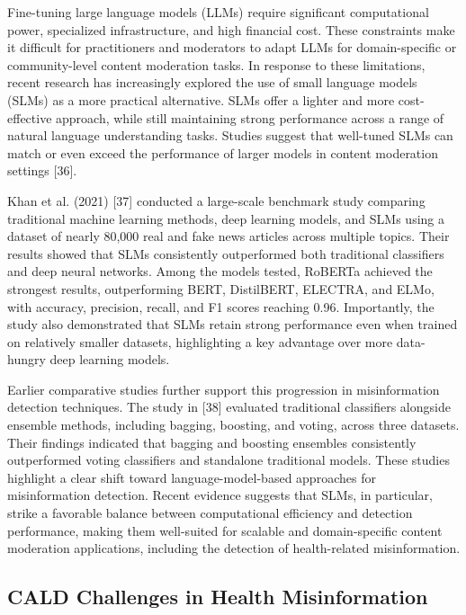 \documentclass[]{article}
\begin{document}
Fine-tuning large language models (LLMs) require significant
computational power, specialized infrastructure, and high financial
cost. These constraints make it difficult for practitioners and
moderators to adapt LLMs for domain-specific or community-level content
moderation tasks. In response to these limitations, recent research has
increasingly explored the use of small language models (SLMs) as a more
practical alternative. SLMs offer a lighter and more cost-effective
approach, while still maintaining strong performance across a range of
natural language understanding tasks. Studies suggest that well-tuned
SLMs can match or even exceed the performance of larger models in
content moderation settings {[}36{]}.

Khan et al. (2021) {[}37{]} conducted a large-scale benchmark study
comparing traditional machine learning methods, deep learning models,
and SLMs using a dataset of nearly 80,000 real and fake news articles
across multiple topics. Their results showed that SLMs consistently
outperformed both traditional classifiers and deep neural networks.
Among the models tested, RoBERTa achieved the strongest results,
outperforming BERT, DistilBERT, ELECTRA, and ELMo, with accuracy,
precision, recall, and F1 scores reaching 0.96. Importantly, the study
also demonstrated that SLMs retain strong performance even when trained
on relatively smaller datasets, highlighting a key advantage over more
data-hungry deep learning models.

Earlier comparative studies further support this progression in
misinformation detection techniques. The study in {[}38{]} evaluated
traditional classifiers alongside ensemble methods, including bagging,
boosting, and voting, across three datasets. Their findings indicated
that bagging and boosting ensembles consistently outperformed voting
classifiers and standalone traditional models. These studies highlight a
clear shift toward language-model-based approaches for misinformation
detection. Recent evidence suggests that SLMs, in particular, strike a
favorable balance between computational efficiency and detection
performance, making them well-suited for scalable and domain-specific
content moderation applications, including the detection of
health-related misinformation.

\subsection{CALD Challenges in Health Misinformation}
\end{document}
